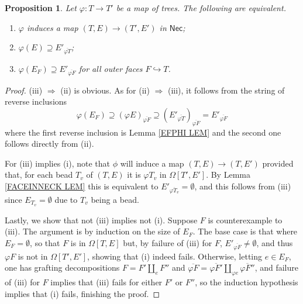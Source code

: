 \documentclass[a4paper,10pt
,draft
]{article}%
\numberwithin{equation}{section}
\numberwithin{figure}{section}
\newtheorem{proposition}[equation]{Proposition}%
\theoremstyle{definition} %
\newcommand{\1}{\ensuremath{\mathbbm 1}}%
\begin{document}
\begin{proposition}\label{NECKMAPCHAR PROP}
	Let $\varphi \colon T \to T'$ be a map of trees. 
	The following are equivalent.
\begin{enumerate}[label=(\roman*)]
\item $\varphi$ induces a map 
	$(T,E) \to (T',E')$ in $\mathsf{Nec}$;
\item $\varphi (E) \supseteq E'_{\overline{\varphi T}}$;
\item $\varphi (E_F) \supseteq E'_{\overline{\varphi F}}$
	for all outer faces $F \hookrightarrow T$.
\end{enumerate}
\end{proposition}


\begin{proof}
(iii) $\Rightarrow$ (ii) is obvious.
As for (ii) $\Rightarrow$ (iii),
it follows from the 
string of reverse inclusions
\[
\varphi(E_F)
	\supseteq
\left(\varphi E\right)_{\overline{\varphi F}}
	\supseteq
\left(E'_{\overline{\varphi T}}\right)_{\overline{\varphi F}}
	=
E'_{\overline{\varphi F}}
\]
where the first reverse inclusion is Lemma \ref{EFPHI LEM}
and the second one follows directly from (ii).


For (iii) implies (i), 
note that $\phi$ will induce a map 
$(T,E) \to (T,E')$
provided that, for each bead $T_v$ of $(T,E)$
it is $\varphi T_v$ in 
$\Omega[T',E']$.
By Lemma \ref{FACEINNECK LEM}
this is equivalent to
$E'_{\overline{\varphi T_v}} = \emptyset$,
and this follows from (iii)
since $E_{T_v} = \emptyset$
due to $T_v$ being a bead.

Lastly, we show that not (iii) implies not (i).
Suppose $F$ is counterexample to (iii).
The argument is by induction on the size of $E_F$.
The base case is that where $E_F = \emptyset$, 
so that $F$ is in 
$\Omega[T,E]$ but, by failure of (iii) for $F$,
$E'_{\overline{\varphi F}} \neq \emptyset$,
and thus $\varphi F$ is not in 
$\Omega[T',E']$,
showing that (i) indeed fails.
Otherwise, letting $e \in E_F$, one has grafting decompositions
$F = F' \amalg_e F''$
and 
$\overline{\varphi F} = 
\overline{\varphi F'}
\amalg_{\varphi e}
\overline{\varphi F''}$,
and failure of (iii) for $F$
implies that (iii) fails for either $F'$ or $F''$,
so the induction hypothesis implies that (i) fails, finishing the proof.
\end{proof}
\end{document}
